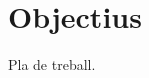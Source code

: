 \documentclass[CAT,TFG,PR,no-cover,toc]{P3CTeX}
\begin{document}
\section{Objectius}
Pla de treball.
\end{document}
